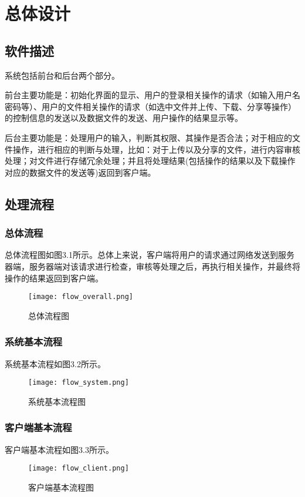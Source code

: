 \chapter{总体设计}
\section{软件描述}
系统包括前台和后台两个部分。

前台主要功能是：初始化界面的显示、用户的登录相关操作的请求（如输入用户名密码等）、用户的文件相关操作的请求（如选中文件并上传、下载、分享等操作）的控制信息的发送以及数据文件的发送、用户操作的结果显示等。

后台主要功能是：处理用户的输入，判断其权限、其操作是否合法；对于相应的文件操作，进行相应的判断与处理，比如：对于上传以及分享的文件，进行内容审核处理；对文件进行存储冗余处理；并且将处理结果(包括操作的结果以及下载操作对应的数据文件的发送等)返回到客户端。

\section{处理流程}
\subsection{总体流程}
总体流程图如图3.1所示。总体上来说，客户端将用户的请求通过网络发送到服务器端，服务器端对该请求进行检查，审核等处理之后，再执行相关操作，并最终将操作的结果返回到客户端。
\begin{figure}[ht] 
\centering
\texttt{[image: flow\_overall.png]} 
\caption{总体流程图}\label{fig:noted-figure}
\end{figure}

\subsection{系统基本流程} 
系统基本流程如图3.2所示。
\begin{figure}
\centering
\texttt{[image: flow\_system.png]}
\caption{系统基本流程图}\label{fig:noted-figure}
\end{figure} 


\subsection{客户端基本流程}
客户端基本流程如图3.3所示。
\begin{figure}
\centering
\texttt{[image: flow\_client.png]}
\caption{客户端基本流程图}\label{fig:noted-figure}
\end{figure}

